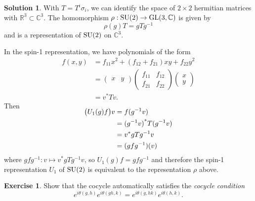 \documentclass[11pt, a4paper]{report}
\theoremstyle{definition}
\newtheorem{ex}{Exercise}[part]
\newtheorem{sol}{Solution}[part]
\newcommand*{\GL}{\ensuremath\text{GL}}
\newcommand*{\SU}{\ensuremath\text{SU}}
\begin{document}
\begin{sol}

With $T = T^i\sigma_i$, we can identify the space of $2 \times 2$ hermitian matrices with $\mathbb{R}^3 \subset \mathbb{C}^3$.
The homomorphism $\rho: \SU(2) \to \GL(3, \mathbb{C})$ is given by
\[
    \rho(g) T = g T g^{-1}
\]
and is a representation of $\SU(2)$ on $\mathbb{C}^3$.

In the spin-1 representation, we have polynomials of the form
\begin{align*}
    f(x, y) &= f_{11} x^2 + (f_{12} + f_{21}) xy + f_{22} y^2 \\
            &= \begin{pmatrix}
                    x & y
               \end{pmatrix}
               \begin{pmatrix}
                    f_{11} & f_{12} \\
                    f_{21} & f_{22}
               \end{pmatrix}
               \begin{pmatrix}
                    x \\ y
               \end{pmatrix} \\
            &= v^* T v.
\end{align*}
Then
\begin{align*}
    \SwapAboveDisplaySkip
    \bigl(U_1(g) f \bigr) v &= f(g^{-1} v) \\
                            &= {(g^{-1} v)}^* T (g^{-1} v) \\
                            &= v^* g T g^{-1} v \\
                            &= (gfg^{-1}) (v)
\end{align*}
where $gfg^{-1}: v \mapsto v^* gTg^{-1} v$,
so $U_1(g) f = gfg^{-1}$ and therefore the spin-1 representation $U_1$ of $\SU(2)$ is equivalent to the representation $\rho$ above.

\end{sol}

\begin{ex}

Show that the cocycle automatically satisfies the \emph{cocycle condition}
\[
    e^{i\theta(g, h)} e^{i\theta(gh, k)} = e^{i\theta(g, hk)} e^{i\theta(h, k)}.
\]

\end{ex}
\end{document}
